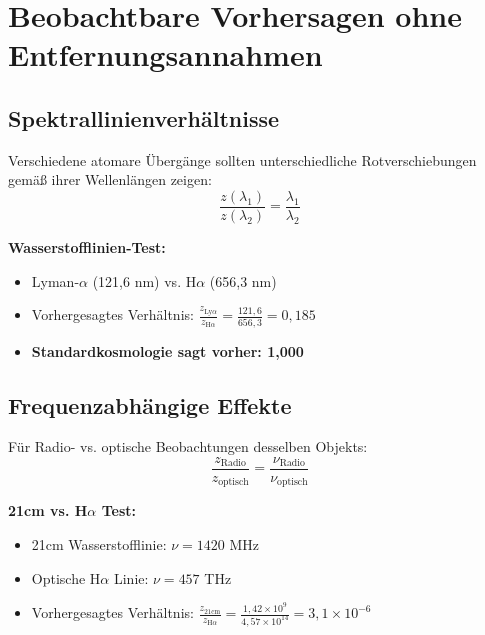\documentclass[12pt,a4paper]{article}
\theoremstyle{definition}
\begin{document}
	\section{Beobachtbare Vorhersagen ohne Entfernungsannahmen}
	
	\subsection{Spektrallinienverh\"altnisse}
	
	Verschiedene atomare \"Uberg\"ange sollten unterschiedliche Rotverschiebungen gem\"a\ss{} ihrer Wellenl\"angen zeigen:
	\begin{equation}
		\frac{z(\lambda_1)}{z(\lambda_2)} = \frac{\lambda_1}{\lambda_2}
	\end{equation}
	
	\begin{experiment}
		\textbf{Wasserstofflinien-Test:}
		\begin{itemize}
			\item Lyman-$\alpha$ (121,6 nm) vs. H$\alpha$ (656,3 nm)
			\item Vorhergesagtes Verh\"altnis: $\frac{z_{\text{Ly}\alpha}}{z_{\text{H}\alpha}} = \frac{121,6}{656,3} = 0,185$
			\item \textbf{Standardkosmologie sagt vorher: 1,000}
		\end{itemize}
	\end{experiment}
	
	\subsection{Frequenzabh\"angige Effekte}
	
	F\"ur Radio- vs. optische Beobachtungen desselben Objekts:
	\begin{equation}
		\frac{z_{\text{Radio}}}{z_{\text{optisch}}} = \frac{\nu_{\text{Radio}}}{\nu_{\text{optisch}}}
	\end{equation}
	
	\begin{experiment}
		\textbf{21cm vs. H$\alpha$ Test:}
		\begin{itemize}
			\item 21cm Wasserstofflinie: $\nu = 1420$ MHz
			\item Optische H$\alpha$ Linie: $\nu = 457$ THz
			\item Vorhergesagtes Verh\"altnis: $\frac{z_{21\text{cm}}}{z_{\text{H}\alpha}} = \frac{1,42 \times 10^9}{4,57 \times 10^{14}} = 3,1 \times 10^{-6}$
		\end{itemize}
	\end{experiment}
	
\end{document}
